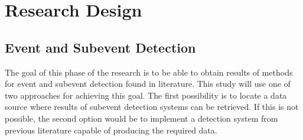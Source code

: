\documentclass[conference]{IEEEtran}
\begin{document}
%



\section{Research Design}
\subsection {Event and Subevent Detection}
The goal of this phase of the research is to be able to obtain results of methods for event and subevent detection found in literature. This study will use one of two approaches for achieving this goal. The first possibility is to locate a data source where results of subevent detection systems can be retrieved. If this is not possible, the second option would be to implement a detection system from previous literature capable of producing the required data.
\end{document}

